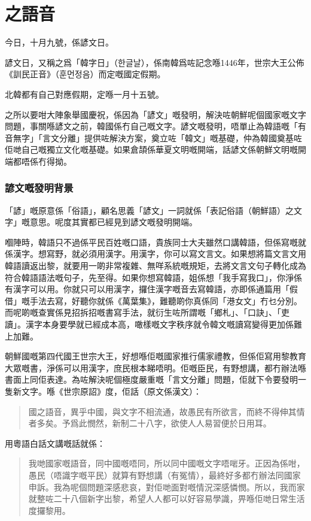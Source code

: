 
\chapter{之語音}


今日，十月九號，係諺文日。

諺文日，又稱之爲「韓字日」（{\koreanfont 한글날}），係南韓爲咗記念喺1446年，世宗大王公佈《訓民正音》（{\koreanfont 훈먼정음}）而定嘅國定假期。

北韓都有自己對應假期，定喺一月十五號。

之所以要咁大陣象舉國慶祝，係因為「諺文」嘅發明，解決咗朝鮮呢個國家嘅文字問題，事關喺諺文之前，韓國係冇自己嘅文字。諺文嘅發明，唔單止為韓語嘅「有音無字」「言文分離」提供咗解決方案，奠立咗「韓文」嘅基礎，仲為韓國奠基咗佢哋自己嘅獨立文化嘅基礎。如果倉頡係華夏文明嘅開端，話諺文係朝鮮文明嘅開端都唔係冇得拗。

\subsection*{諺文嘅發明背景}

「諺」嘅原意係「俗語」，顧名思義「諺文」一詞就係「表記俗語（朝鮮語）之文字」嘅意思。呢度其實都已經見到諺文嘅發明開端。

嗰陣時，韓語只不過係平民百姓嘅口語，貴族同士大夫雖然口講韓語，但係寫嘅就係漢字。想寫野，就必須用漢字。用漢字，你可以寫文言文。如果想將篇文言文用韓語讀返出黎，就要用一啲非常複雜、無咩系統嘅規矩，去將文言文句子轉化成為符合韓語語法嘅句子，先至得。如果你想寫韓語，姐係想「我手寫我口」，你淨係有漢字可以用。你就只可以用漢字，攞住漢字嘅音去寫韓語，亦即係通篇用「假借」嘅手法去寫，好聽你就係《萬葉集》，難聽啲你真係同「港女文」冇乜分別。而呢啲嘅查實係見招拆招嘅書寫手法，就衍生咗所謂嘅「鄉札」、「口訣」、「吏讀」。漢字本身要學就已經成本高，噉樣嘅文字秩序就令韓文嘅讀寫變得更加係難上加難。

朝鮮國嘅第四代國王世宗大王，好想喺佢嘅國家推行儒家禮教，但係佢寫用黎教育大眾嘅書，淨係可以用漢字，庶民根本睇唔明。佢嘅臣民，有野想講，都冇辦法喺書面上同佢表達。為咗解決呢個極度嚴重嘅「言文分離」問題，佢就下令要發明一隻新文字。喺《世宗原詔》度，佢話（原文係漢文）：
\begin{quotation}
  國之語音，異乎中國，與文字不相流通，故愚民有所欲言，而終不得伸其情者多矣。予爲此憫然，新制二十八字，欲使人人易習便於日用耳。

\end{quotation}
用粵語白話文講嘅話就係：

\begin{quotation}
  我哋國家嘅語音，同中國嘅唔同，所以同中國嘅文字唔啱牙。正因為係咁，愚民（唔識字嘅平民）就算有野想講（有冤情），最終好多都冇辦法同國家申訴。我為呢個問題深感悲哀，對佢哋面對嘅情況深感憐憫。所以，我而家就整咗二十八個新字出黎，希望人人都可以好容易學識，畀喺佢哋日常生活度攞黎用。
\end{quotation}

